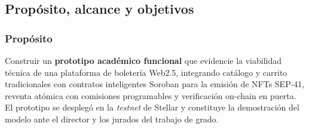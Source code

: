 \documentclass[12pt,oneside]{report}
\begin{document}
    \subsection{Propósito, alcance y objetivos}
    \label{subsec:proposito-alcance}

      \subsubsection*{Propósito}
      Construir un \textbf{prototipo académico funcional} que evidencie la viabilidad técnica de una plataforma de boletería Web2.5, integrando catálogo y carrito tradicionales con contratos inteligentes Soroban para la emisión de NFTs SEP-41, reventa atómica con comisiones programables y verificación on-chain en puerta. El prototipo se desplegó en la \textit{testnet} de Stellar y constituye la demostración del modelo ante el director y los jurados del trabajo de grado.
\end{document}
